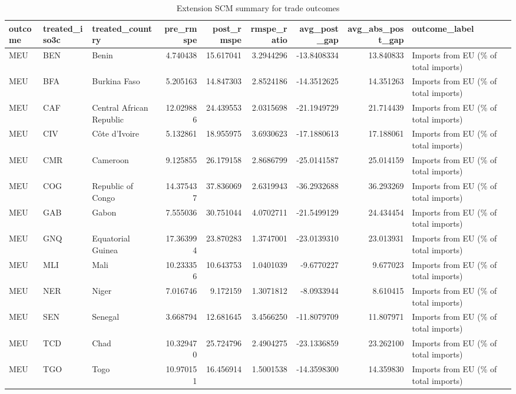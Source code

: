 \begin{table}

\caption{Extension SCM summary for trade outcomes}
\centering
\begin{tabular}[t]{lllrrrrrl}
\toprule
outcome & treated\_iso3c & treated\_country & pre\_rmspe & post\_rmspe & rmspe\_ratio & avg\_post\_gap & avg\_abs\_post\_gap & outcome\_label\\
\midrule
MEU & BEN & Benin & 4.740438 & 15.617041 & 3.2944296 & -13.8408334 & 13.840833 & Imports from EU (\% of total imports)\\
MEU & BFA & Burkina Faso & 5.205163 & 14.847303 & 2.8524186 & -14.3512625 & 14.351263 & Imports from EU (\% of total imports)\\
MEU & CAF & Central African Republic & 12.029886 & 24.439553 & 2.0315698 & -21.1949729 & 21.714439 & Imports from EU (\% of total imports)\\
MEU & CIV & Côte d'Ivoire & 5.132861 & 18.955975 & 3.6930623 & -17.1880613 & 17.188061 & Imports from EU (\% of total imports)\\
MEU & CMR & Cameroon & 9.125855 & 26.179158 & 2.8686799 & -25.0141587 & 25.014159 & Imports from EU (\% of total imports)\\
\addlinespace
MEU & COG & Republic of Congo & 14.375437 & 37.836069 & 2.6319943 & -36.2932688 & 36.293269 & Imports from EU (\% of total imports)\\
MEU & GAB & Gabon & 7.555036 & 30.751044 & 4.0702711 & -21.5499129 & 24.434454 & Imports from EU (\% of total imports)\\
MEU & GNQ & Equatorial Guinea & 17.363994 & 23.870283 & 1.3747001 & -23.0139310 & 23.013931 & Imports from EU (\% of total imports)\\
MEU & MLI & Mali & 10.233356 & 10.643753 & 1.0401039 & -9.6770227 & 9.677023 & Imports from EU (\% of total imports)\\
MEU & NER & Niger & 7.016746 & 9.172159 & 1.3071812 & -8.0933944 & 8.610415 & Imports from EU (\% of total imports)\\
\addlinespace
MEU & SEN & Senegal & 3.668794 & 12.681645 & 3.4566250 & -11.8079709 & 11.807971 & Imports from EU (\% of total imports)\\
MEU & TCD & Chad & 10.329470 & 25.724796 & 2.4904275 & -23.1336859 & 23.262100 & Imports from EU (\% of total imports)\\
MEU & TGO & Togo & 10.970151 & 16.456914 & 1.5001538 & -14.3598300 & 14.359830 & Imports from EU (\% of total imports)\\

\end{tabular}
\end{table}
